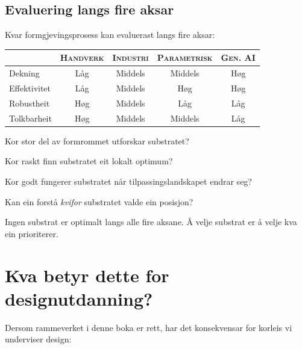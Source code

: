 \subsection{Evaluering langs fire aksar}

Kvar formgjevingsprosess kan evaluerast langs fire aksar:

\medskip
\begin{center}
\begin{tabular}{@{}lcccc@{}}
\toprule
& \textsc{Handverk} & \textsc{Industri}
  & \textsc{Parametrisk} & \textsc{Gen. AI} \\
\midrule
Dekning & Låg & Middels & Middels & Høg \\
Effektivitet & Låg & Middels & Høg & Høg \\
Robustheit & Høg & Middels & Låg & Låg \\
Tolkbarheit & Høg & Middels & Middels & Låg \\
\bottomrule
\end{tabular}
\end{center}

\medskip
\begin{description}[nosep]
  \item[Dekning:] Kor stor del av formrommet utforskar substratet?
  \item[Effektivitet:] Kor raskt finn substratet eit lokalt
    optimum?
  \item[Robustheit:] Kor godt fungerer substratet når
    tilpassingslandskapet endrar seg?
  \item[Tolkbarheit:] Kan ein forstå \emph{kvifor} substratet
    valde ein posisjon?
\end{description}

\medskip
Ingen substrat er optimalt langs alle fire aksane. Å velje substrat
er å velje kva ein prioriterer.


\section{Kva betyr dette for designutdanning?}

Dersom rammeverket i denne boka er rett, har det konsekvensar for
korleis vi underviser design:

